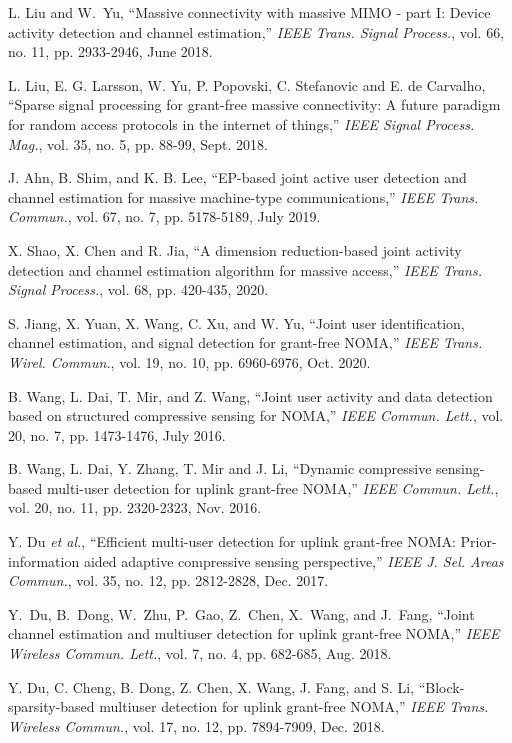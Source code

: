 \documentclass[journal]{IEEEtran}
\numberwithin{const2}{const}
\begin{document}
\begin{thebibliography}{1}
	L. Liu and W.~Yu, 
	``Massive connectivity with massive MIMO - part I: Device activity detection and channel estimation,'' 
	\emph{IEEE Trans. Signal Process.}, vol. 66, no. 11, pp. 2933-2946, June 2018.	
	
	L. Liu, E. G. Larsson, W. Yu, P. Popovski, C. Stefanovic and E. de Carvalho, 
	``Sparse signal processing for grant-free massive connectivity: 
	A future paradigm for random access protocols in the internet of things,'' 
	\emph{IEEE Signal Process. Mag.}, vol. 35, no. 5, pp. 88-99, Sept. 2018.
	
	J. Ahn, B. Shim, and K. B. Lee,
	``EP-based joint active user detection and channel estimation for massive machine-type communications,''
	\emph{IEEE Trans. Commun.}, vol. 67, no. 7, pp. 5178-5189, July 2019.	
	
	X. Shao, X. Chen and R. Jia, 
	``A dimension reduction-based joint activity detection and channel estimation algorithm for massive access,'' 
	\emph{IEEE Trans. Signal Process.}, vol. 68, pp. 420-435, 2020.
	
	S. Jiang, X. Yuan, X. Wang, C. Xu, and W. Yu,
	``Joint user identification, channel estimation, and signal detection for grant-free NOMA,''
	\emph{IEEE Trans. Wirel. Commun.}, vol. 19, no. 10, pp. 6960-6976, Oct. 2020.	
	
	
	B. Wang, L. Dai, T. Mir, and Z. Wang,
	``Joint user activity and data detection based on structured compressive sensing for NOMA,''
	\emph{IEEE Commun. Lett.}, vol. 20, no. 7, pp. 1473-1476, July 2016.	
	
	B. Wang, L. Dai, Y. Zhang, T. Mir and J. Li, 
	``Dynamic compressive sensing-based multi-user detection for uplink grant-free NOMA,''
	\emph{IEEE Commun. Lett.}, vol. 20, no. 11, pp. 2320-2323, Nov. 2016.
	
	Y. Du \emph{et al.}, 
	``Efficient multi-user detection for uplink grant-free NOMA: 
	Prior-information aided adaptive compressive sensing perspective,''
	\emph{IEEE J. Sel. Areas Commun.}, vol. 35, no. 12, pp. 2812-2828, Dec. 2017.
	
	Y.~Du, B.~Dong, W.~Zhu, P.~Gao, Z.~Chen, X.~Wang, and J.~Fang,
	``Joint channel estimation and multiuser detection for uplink grant-free NOMA,''
	\emph{IEEE Wireless Commun. Lett.}, vol. 7, no. 4, pp. 682-685, Aug. 2018.
	
	Y. Du, C. Cheng, B. Dong, Z. Chen, X. Wang, J. Fang, and S. Li,
	``Block-sparsity-based multiuser detection for uplink grant-free NOMA,''
	\emph{IEEE Trans. Wireless Commun.}, vol. 17, no. 12, pp. 7894-7909, Dec. 2018.	
	


\end{thebibliography}
\end{document}

